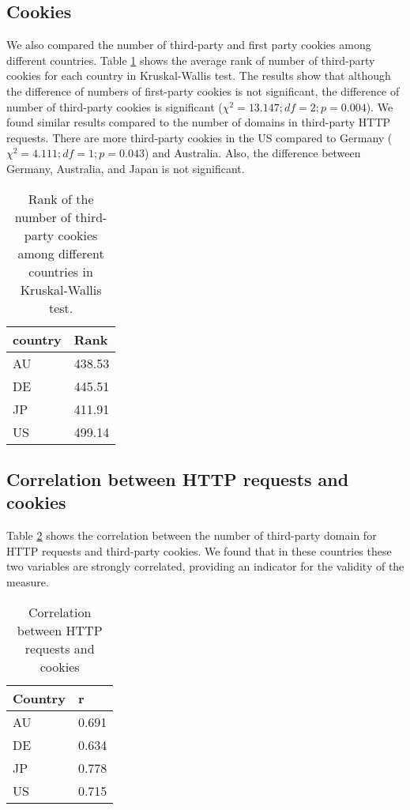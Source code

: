 \documentclass[conference]{IEEEtran}
\begin{document}
\subsection{Cookies}
We also compared the number of third-party and first party cookies among different countries. 
Table \ref{thirdcookie} shows the average rank of number of third-party cookies for each country in Kruskal-Wallis test. The results show that although the difference of numbers of first-party cookies is not significant, the difference of number of third-party cookies is significant ($\chi^{2}=13.147; df=2; p=0.004$).
We found similar results compared to the number of domains in third-party HTTP requests. There are more third-party cookies in the US compared to Germany ($\chi^{2} = 4.111; df=1; p=0.043$) and Australia. Also, the difference between Germany, Australia, and Japan is not significant.

\begin{table}[t]
\centering
\caption{Rank of the number of third-party cookies among different countries in Kruskal-Wallis test.}
\label{thirdcookie}
\begin{tabular}{|l|l|}
\hline
\textbf{country} & \textbf{Rank} \\ \hline
AU               & 438.53        \\ \hline
DE               & 445.51        \\ \hline
JP               & 411.91        \\ \hline
US               & 499.14        \\ \hline
\end{tabular}
\end{table}


\subsection{Correlation between HTTP requests and cookies}
Table \ref{correlation} shows the correlation between the number of third-party domain for HTTP requests and third-party cookies. We found that in these countries these two variables are strongly correlated, providing an indicator for the validity of the measure.

\begin{table}[t]
\centering
\caption{Correlation between HTTP requests and cookies}
\label{correlation}
\begin{tabular}{|l|l|}
\hline
\textbf{Country} & \textbf{r} \\ \hline
AU               & 0.691      \\ \hline
DE               & 0.634      \\ \hline
JP               & 0.778      \\ \hline
US               & 0.715   \\  \hline
\end{tabular}
\end{table}
\end{document}
